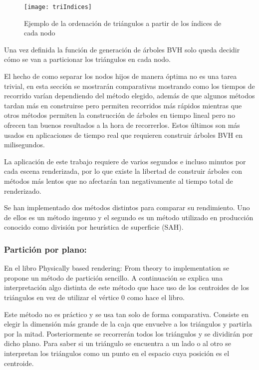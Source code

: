 \begin{figure}[H]
    \centering
	\texttt{[image: triIndices]}
	\caption{Ejemplo de la ordenación de triángulos a partir de los índices de cada nodo}
	\label{fig:triindices}
\end{figure}

Una vez definida la función de generación de árboles BVH solo queda decidir cómo se van a particionar los triángulos en cada nodo.

El hecho de como separar los nodos hijos de manera óptima no es una tarea trivial, en esta sección se mostrarán comparativas mostrando como los tiempos de recorrido varían dependiendo del método elegido, además de que algunos métodos tardan más en construirse pero permiten recorridos más rápidos mientras que otros métodos permiten la construcción de árboles en tiempo lineal pero no ofrecen tan buenos resultados a la hora de recorrerlos. Estos últimos son más usados en aplicaciones de tiempo real que requieren construir árboles BVH en milisegundos.

La aplicación de este trabajo requiere de varios segundos e incluso minutos por cada escena renderizada, por lo que existe la libertad de construir árboles con métodos más lentos que no afectarán tan negativamente al tiempo total de renderizado.

Se han implementado dos métodos distintos para comparar su rendimiento. Uno de ellos es un método ingenuo y el segundo es un método utilizado en producción conocido como división por heurística de superficie (SAH).

\subsubsection{Partición por plano:}

En el libro Physically based rendering: From theory to implementation \cite{pharr2016physically} se propone un método de partición sencillo. A continuación se explica una interpretación algo distinta de este método que hace uso de los centroides de los triángulos en vez de utilizar el vértice 0 como hace el libro.

Este método no es práctico y se usa tan solo de forma comparativa. Consiste en elegir la dimensión más grande de la caja que envuelve a los triángulos y partirla por la mitad. Posteriormente se recorrerán todos los triángulos y se dividirán por dicho plano. Para saber si un triángulo se encuentra a un lado o al otro se interpretan los triángulos como un punto en el espacio cuya posición es el centroide.

